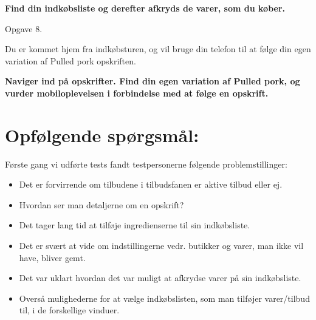 \textbf{Find din indkøbsliste og derefter afkryds de varer, som du køber.}

Opgave 8.

Du er kommet hjem fra indkøbsturen, og vil bruge din telefon til at følge din egen variation af Pulled pork opskriften.

\textbf{Naviger ind på opskrifter. Find din egen variation af Pulled pork, og vurder mobiloplevelsen i forbindelse med at følge en opskrift. }


\section{Opfølgende spørgsmål:}

Første gang vi udførte tests fandt testpersonerne følgende problemstillinger:

\begin{itemize}
	\item Det er forvirrende om tilbudene i tilbudsfanen er aktive tilbud eller ej.
	\item Hvordan ser man detaljerne om en opskrift?
	\item Det tager lang tid at tilføje ingredienserne til sin indkøbsliste.
	\item Det er svært at vide om indstillingerne vedr. butikker og varer, man ikke vil have, bliver gemt.
	\item Det var uklart hvordan det var muligt at afkrydse varer på sin indkøbsliste.
	\item Overså mulighederne for at vælge indkøbslisten, som man tilføjer varer/tilbud til, i de forskellige vinduer.
\end{itemize}

